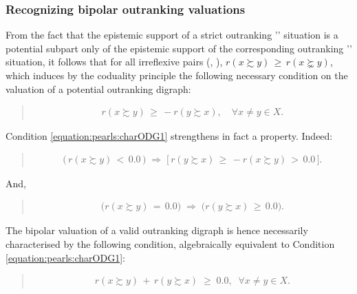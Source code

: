\documentclass[a4paper,12pt,english]{sphinxhowto}
\begin{document}
\subsubsection{Recognizing bipolar outranking valuations}
\label{\detokenize{pearls:recognizing-bipolar-outranking-valuations}}
\sphinxAtStartPar
From the fact that the epistemic support of a strict outranking \textendash{}’’\textendash{} situation is a potential sub\sphinxhyphen{}part only of the epistemic support of the corresponding outranking \textendash{}’’\textendash{} situation, it follows that for all irreflexive pairs (, ), \(r(x \succsim y)\, \geqslant\, r(x \succnsim y)\), which induces by the coduality principle the following necessary condition on the valuation of a potential outranking digraph:
\begin{quote}
\begin{equation}\label{equation:pearls:charODG1}
\begin{split}r(x \succsim y)\, \geqslant\, -r(y \succsim x), \quad \forall x \neq y \in X.\end{split}
\end{equation}\end{quote}

\sphinxAtStartPar
Condition \eqref{equation:pearls:charODG1} strengthens in fact a  property. Indeed:
\begin{quote}
\begin{equation}\label{equation:pearls:weakComp}
\begin{split}\big(\, r(x \succsim y)\, <\, 0.0\, \big) \; \Rightarrow \; \big[\, r(y \succsim x)\, \geqslant\, -r(x \succsim y)\, >\, 0.0 \,\big].\end{split}
\end{equation}\end{quote}

\sphinxAtStartPar
And,
\begin{quote}
\begin{equation}\label{equation:pearls:indODG}
\begin{split}\big(r(x \succsim y)\, =\, 0.0\big)\; \Rightarrow \; \big(r(y \succsim x)\, \geqslant\, 0.0\big).\end{split}
\end{equation}\end{quote}

\sphinxAtStartPar
The bipolar valuation of a valid outranking digraph is hence necessarily characterised by the following  condition, algebraically equivalent to Condition \eqref{equation:pearls:charODG1}:
\begin{quote}
\begin{equation}\label{equation:pearls:charODG2}
\begin{split}r(x \succsim y)\,+\,r(y \succsim x) \; \geqslant \; 0.0, \;\; \forall x \neq y \in X.\end{split}
\end{equation}\end{quote}
\end{document}
